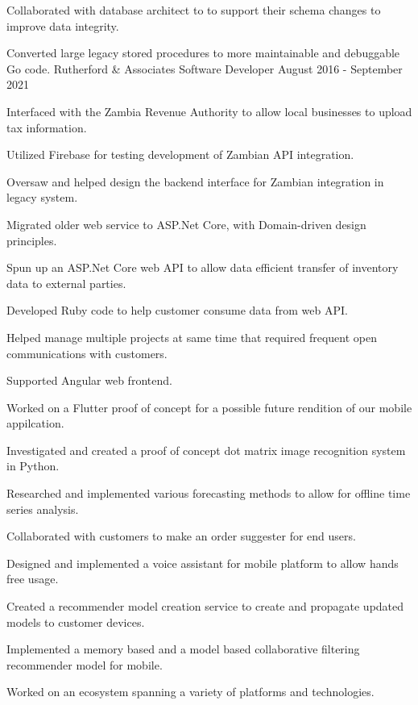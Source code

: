 \documentclass{marvinkassabian_resume}
\begin{document}
				\item Collaborated with database architect to to support their schema changes to improve data integrity.
				\item Converted large legacy stored procedures to more maintainable and debuggable Go code.
			\resumesublistend
		\subsectionpositiondate
				{Rutherford \& Associates}
				{Software Developer}
				{August 2016 - September 2021}
			\resumesublistbegin
				\item Interfaced with the Zambia Revenue Authority to allow local businesses to upload tax information.
				\item Utilized Firebase for testing development of Zambian API integration.
				\item Oversaw and helped design the backend interface for Zambian integration in legacy system.
				\item Migrated older web service to ASP.Net Core, with Domain-driven design principles.
				\item Spun up an ASP.Net Core web API to allow data efficient transfer of inventory data to external parties.
				\item Developed Ruby code to help customer consume data from web API.
				\item Helped manage multiple projects at same time that required frequent open communications with customers.
				\item Supported Angular web frontend.
				\item Worked on a Flutter proof of concept for a possible future rendition of our mobile appilcation.
				\item Investigated and created a proof of concept dot matrix image recognition system in Python.
				\item Researched and implemented various forecasting methods to allow for offline time series analysis.
				\item Collaborated with customers to make an order suggester for end users.
				\item Designed and implemented a voice assistant for mobile platform to allow hands free usage. 
				\item Created a recommender model creation service to create and propagate updated models to customer devices.
				\item Implemented a memory based and a model based collaborative filtering recommender model for mobile.
				\item Worked on an ecosystem spanning a variety of platforms and technologies.
\end{document}
